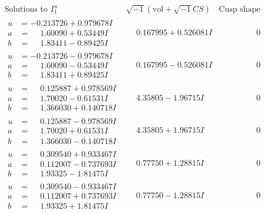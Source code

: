\documentclass[1p]{elsarticle_modified}
\theoremstyle{definition}
\newcommand{\I}{\sqrt{-1}}
\begin{document}
$$\begin{array}{c|c|c}  
\text{Solutions to }I^u_{1}& \I (\text{vol} + \sqrt{-1}CS) & \text{Cusp shape}\\
 \hline 
\begin{aligned}
u &= -0.213726 + 0.979678 I \\
a &= \phantom{-}1.60090 + 0.53449 I \\
b &= \phantom{-}1.83411 - 0.89425 I\end{aligned}
 & \phantom{-}0.167995 + 0.526081 I & \phantom{-0.000000 } 0 \\ \hline\begin{aligned}
u &= -0.213726 - 0.979678 I \\
a &= \phantom{-}1.60090 - 0.53449 I \\
b &= \phantom{-}1.83411 + 0.89425 I\end{aligned}
 & \phantom{-}0.167995 - 0.526081 I & \phantom{-0.000000 } 0 \\ \hline\begin{aligned}
u &= \phantom{-}0.125887 + 0.978569 I \\
a &= \phantom{-}1.70020 - 0.61531 I \\
b &= \phantom{-}1.366030 + 0.140718 I\end{aligned}
 & \phantom{-}4.35805 - 1.96715 I & \phantom{-0.000000 } 0 \\ \hline\begin{aligned}
u &= \phantom{-}0.125887 - 0.978569 I \\
a &= \phantom{-}1.70020 + 0.61531 I \\
b &= \phantom{-}1.366030 - 0.140718 I\end{aligned}
 & \phantom{-}4.35805 + 1.96715 I & \phantom{-0.000000 } 0 \\ \hline\begin{aligned}
u &= \phantom{-}0.309540 + 0.933467 I \\
a &= \phantom{-}0.112007 - 0.737693 I \\
b &= \phantom{-}1.93325 - 1.81475 I\end{aligned}
 & \phantom{-}0.77750 + 1.28815 I & \phantom{-0.000000 } 0 \\ \hline\begin{aligned}
u &= \phantom{-}0.309540 - 0.933467 I \\
a &= \phantom{-}0.112007 + 0.737693 I \\
b &= \phantom{-}1.93325 + 1.81475 I\end{aligned}
 & \phantom{-}0.77750 - 1.28815 I & \phantom{-0.000000 } 0 \\ \hline\begin{aligned}

\end{aligned}
\end{array}$$
\end{document}
